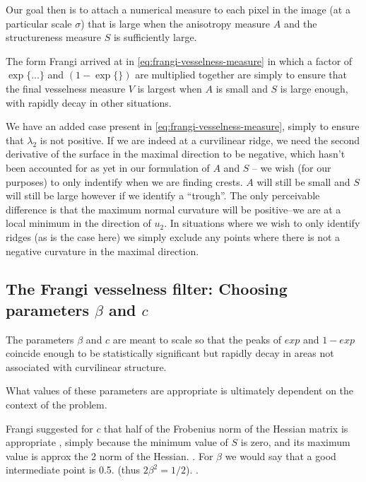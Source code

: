 Our goal then is to attach a numerical measure to each pixel in the image (at a particular scale $\sigma$) that is large when the anisotropy measure $A$ and the structureness measure $S$ is sufficiently large.

The form Frangi arrived at in \cref{eq:frangi-vesselness-measure} in which a factor of $\exp\{...\}$ and $(1 - \exp\{\})$ are multiplied together are simply to ensure that the final vesselness measure $V$ is largest when $A$ is small and $S$ is large enough, with rapidly decay in other situations.

We have an added case present in \cref{eq:frangi-vesselness-measure}, simply to ensure that $\lambda_2$ is not positive. If we are indeed at a curvilinear ridge, we need the second derivative of the surface in the maximal direction to be negative, which hasn't been accounted for as yet in our formulation of $A$ and $S$ -- we wish (for our purposes) to only indentify when we are finding crests. $A$ will still be small and $S$ will still be large however if we identify a ``trough''.
The only perceivable difference is that the maximum normal curvature will be positive--we are at a local minimum in the direction of $u_2$. In situations where we wish to only identify ridges (as is the case here) we simply exclude any points where there is not a negative curvature in the maximal direction. 


\subsection{The Frangi vesselness filter: Choosing parameters $\beta$ and $c$}

The parameters $\beta$ and $c$ are meant to scale so that the peaks of $exp$ and $1-exp$ coincide enough to be statistically significant but rapidly decay in areas not associated with curvilinear structure.

What values of these parameters are appropriate is ultimately dependent on the context of the problem.

Frangi suggested for $c$ that half of the Frobenius norm of the Hessian matrix is appropriate , simply because the minimum value of $S$ is zero, and  its maximum value is approx the 2 norm of the Hessian. . For $\beta$ we would say that a good intermediate point is 0.5.
(thus $2\beta^2 = 1/2$). .

